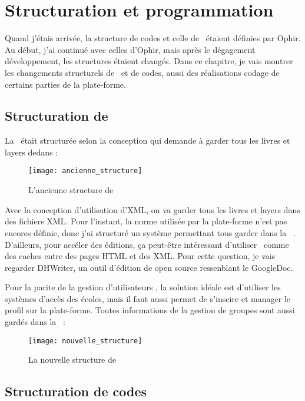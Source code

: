 \section{Structuration et programmation}

Quand j'étais arrivée, la structure de codes et celle de \db\ étaient définies par Ophir. Au début, j'ai continué avec celles d'Ophir, mais après le dégagement développement, les structures étaient changés. Dans ce chapitre, je vais montrer les changements structurels de \db\ et de codes, aussi des réalisations codage de certains parties de la plate-forme.

\subsection{Structuration de \db\ }

La \db\ était structurée selon la conception qui demande à garder tous les livres et layers dedans :

\begin{figure}[H]
\centering
\texttt{[image: ancienne\_structure]}
\caption{L'ancienne structure de \db\ }
\end{figure}

Avec la conception d'utilisation d'XML, on va garder tous les livres et layers dans des fichiers XML. Pour l'instant, la norme utilisée par la plate-forme n'est pas encores définie, donc j'ai structuré un système permettant tous garder dans la \db\ . D'ailleurs, pour accéler des éditions, ça peut-être intéressant d'utiliser \db\ comme des caches entre des pages HTML et des XML. Pour cette question, je vais regarder DHWriter, un outil d'édition de open source ressenblant le GoogleDoc. 

Pour la parite de la gestion d'utilisateurs , la solution idéale est d'utiliser les systèmes d'accès des écoles, mais il faut aussi permet de s'inscire et manager le profil sur la plate-forme. Toutes informations de la gestion de groupes sont aussi gardés dans la \db\ :

\begin{figure}[H]
\centering
\texttt{[image: nouvelle\_structure]}
\caption{La nouvelle structure de \db\ }
\end{figure}

\subsection{Structuration de codes}

